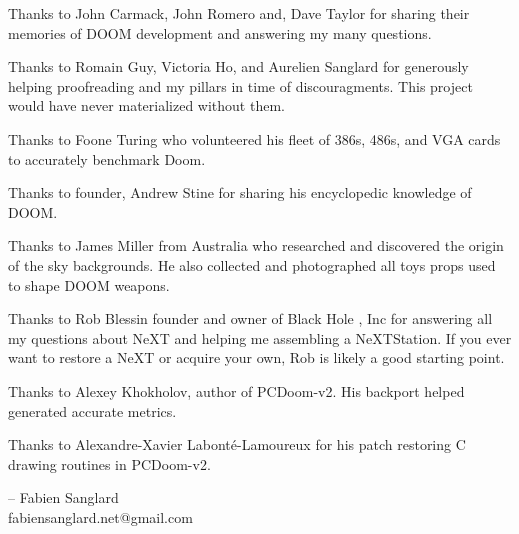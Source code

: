 Thanks to John Carmack, John Romero and, Dave Taylor for sharing their memories of DOOM development and answering my many questions.\\
\par
Thanks to Romain Guy, Victoria Ho, and Aurelien Sanglard for generously helping proofreading and my pillars in time of discouragments. This project would have never materialized without them.\\ 
\par
Thanks to Foone Turing who volunteered his fleet of 386s, 486s, and VGA cards to accurately benchmark Doom.\\
\par
Thanks to  founder, Andrew Stine for sharing his encyclopedic knowledge of DOOM.\\
\par
Thanks to James Miller from Australia who researched and discovered the origin of the sky backgrounds. He also collected and photographed all toys props used to shape DOOM weapons.\\
\par
Thanks to Rob Blessin founder and owner of Black Hole , Inc for answering all my questions about NeXT and helping me assembling a NeXTStation. If you ever want to restore a NeXT or acquire your own, Rob is likely a good starting point.\\
\par
Thanks to Alexey Khokholov, author of PCDoom-v2. His backport helped generated accurate metrics.\\
\par
Thanks to Alexandre-Xavier Labont\'e-Lamoureux for his patch restoring C drawing routines in PCDoom-v2.\\
\par
-- Fabien Sanglard\\
fabiensanglard.net@gmail.com
